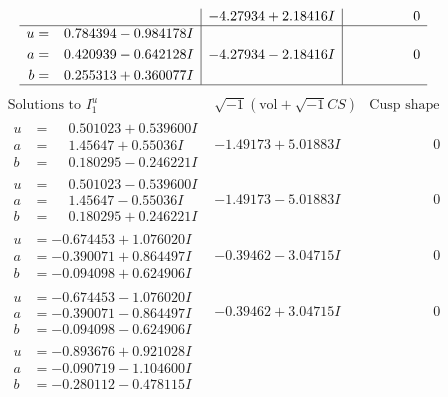 \documentclass[1p]{elsarticle_modified}
\theoremstyle{definition}
\newcommand{\I}{\sqrt{-1}}
\begin{document}
$$\begin{array}{c|c|c}
 & -4.27934 + 2.18416 I & \phantom{-0.000000 } 0 \\ \hline\begin{aligned}
u &= \phantom{-}0.784394 - 0.984178 I \\
a &= \phantom{-}0.420939 - 0.642128 I \\
b &= \phantom{-}0.255313 + 0.360077 I\end{aligned}
 & -4.27934 - 2.18416 I & \phantom{-0.000000 } 0\\
 \hline 
 \end{array}$$\newpage$$\begin{array}{c|c|c}  
\text{Solutions to }I^u_{1}& \I (\text{vol} + \sqrt{-1}CS) & \text{Cusp shape}\\
 \hline 
\begin{aligned}
u &= \phantom{-}0.501023 + 0.539600 I \\
a &= \phantom{-}1.45647 + 0.55036 I \\
b &= \phantom{-}0.180295 - 0.246221 I\end{aligned}
 & -1.49173 + 5.01883 I & \phantom{-0.000000 } 0 \\ \hline\begin{aligned}
u &= \phantom{-}0.501023 - 0.539600 I \\
a &= \phantom{-}1.45647 - 0.55036 I \\
b &= \phantom{-}0.180295 + 0.246221 I\end{aligned}
 & -1.49173 - 5.01883 I & \phantom{-0.000000 } 0 \\ \hline\begin{aligned}
u &= -0.674453 + 1.076020 I \\
a &= -0.390071 + 0.864497 I \\
b &= -0.094098 + 0.624906 I\end{aligned}
 & -0.39462 - 3.04715 I & \phantom{-0.000000 } 0 \\ \hline\begin{aligned}
u &= -0.674453 - 1.076020 I \\
a &= -0.390071 - 0.864497 I \\
b &= -0.094098 - 0.624906 I\end{aligned}
 & -0.39462 + 3.04715 I & \phantom{-0.000000 } 0 \\ \hline\begin{aligned}
u &= -0.893676 + 0.921028 I \\
a &= -0.090719 - 1.104600 I \\
b &= -0.280112 - 0.478115 I\end{aligned}

\end{array}$$
\end{document}
